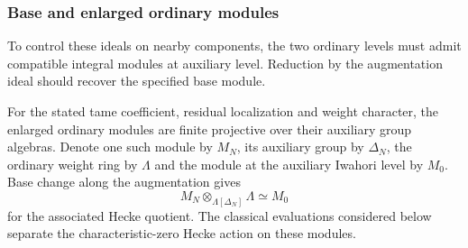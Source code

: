 \subsubsection{Base and enlarged ordinary modules}
\label{par:ordinary-functions}

To control these ideals on nearby components, the two ordinary levels must admit compatible integral modules at auxiliary level. Reduction by the augmentation ideal should recover the specified base module.

\begin{proposition}\label{prop:ordinary-level-modules}
For the stated tame coefficient, residual localization and weight
character, the enlarged ordinary modules are finite projective over
their auxiliary group algebras. Denote one such module by \(M_N\), its auxiliary group by \(\Delta_N\), the ordinary weight ring by \(\Lambda\) and the module at the auxiliary Iwahori level by \(M_0\). Base change along the augmentation gives 
\[
 M_N\otimes_{\Lambda[\Delta_N]}\Lambda\simeq M_0
\]
 for the associated Hecke quotient. The
classical evaluations considered below separate the characteristic-zero
Hecke action on these modules.
\end{proposition}

